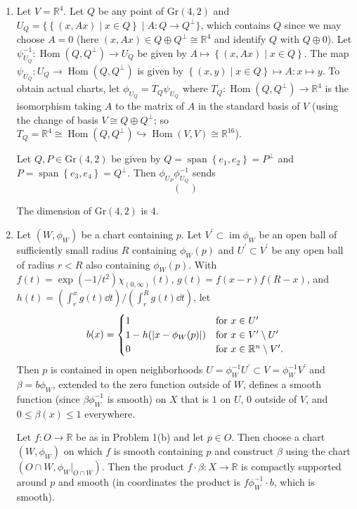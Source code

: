 \documentclass[11pt,leqno]{article}
\theoremstyle{plain}
\theoremstyle{definition}
\numberwithin{equation}{section}
\numberwithin{lem}{section}
\newcommand{\cbr}[1]{\left\{#1\right\}}
\DeclareMathOperator{\Span}{span}
\DeclareMathOperator{\im}{im}
\DeclareMathOperator{\Hom}{Hom}
\newcommand{\Gr}{\mathrm{Gr}}
\begin{document}
\begin{enumerate}
    \item Let $V = \mathbb R^4$. Let $Q$ be any point of $\Gr(4,2)$ and $U_Q = \{\cbr{(x,Ax)\mid x\in Q}\mid A\colon Q\to Q^\perp\}$, which contains $Q$ since we may choose $A = 0$ (here $(x,Ax)\in Q\oplus Q^\perp\cong \mathbb R^4$ and identify $Q$ with $Q\oplus 0$). Let $\psi_{U_Q}^{-1}\colon \Hom(Q,Q^\perp)\to U_Q$ be given by $A\mapsto \cbr{(x,Ax)\mid x\in Q}$. The map $\psi_{U_Q}\colon U_Q\to\Hom(Q,Q^\perp)$ is given by $\cbr{(x,y)\mid x\in Q}\mapsto A\colon x\mapsto y$. To obtain actual charts, let $\phi_{U_Q} = T_Q\psi_{U_Q}$ where $T_Q\colon \Hom(Q,Q^\perp)\to\mathbb R^4$ is the isomorphism taking $A$ to the matrix of $A$ in the standard basis of $V$ (using the change of basis $V \cong Q\oplus Q^\perp$; so $T_Q = \mathbb R^4\cong \Hom(Q,Q^\perp)\hookrightarrow \Hom(V,V)\cong \mathbb R^{16}$).
    
    Let $Q,P\in \Gr(4,2)$ be given by $Q = \Span\cbr{e_1,e_2} = P^\perp$ and $P = \Span\cbr{e_3,e_4} = Q^\perp$. Then $\phi_{U_P}\phi_{U_Q}^{-1}$ sends 
    \[\begin{pmatrix}
      
    \end{pmatrix}\]
    
    The dimension of $\Gr(4,2)$ is $4$.
    \item Let $(W,\phi_W)$ be a chart containing $p$. Let $V^\prime\subset \im\phi_W$ be an open ball of sufficiently small radius $R$ containing $\phi_W(p)$ and $U^\prime\subset V^\prime$ be any open ball of radius $r<R$ also containing $\phi_W(p)$. With $f(t) = \exp(-1/t^2)\chi_{(0,\infty)}(t)$, $g(t) = f(x-r)f(R-x)$, and $h(t) = (\int_r^xg(t)\dd t)/(\int_r^Rg(t)\dd t)$, let 
    \[b(x) = \begin{cases}
      1 & \text{for }x\in U^\prime\\
      1-h(\abs{x-\phi_W(p)}) & \text{for }x\in V^\prime\setminus U^\prime\\
      0 & \text{for } x\in \mathbb R^n\setminus V^\prime.
    \end{cases}\]
    Then $p$ is contained in open neighborhoods $U = \phi_W^{-1}U^\prime\subset V = \phi_W^{-1}V^\prime$ and $\beta = b\phi_W$, extended to the zero function outside of $W$, defines a smooth function (since $\beta\phi_W^{-1}$ is smooth) on $X$ that is $1$ on $U$, $0$ outside of $V$, and $0\leq \beta(x)\leq 1$ everywhere. 

    Let $f\colon O\to \mathbb R$ be as in Problem 1(b) and let $p\in O$. Then choose a chart $(W,\phi_W)$ on which $f$ is smooth containing $p$ and construct $\beta$ using the chart $(O\cap W,\phi_W|_{O\cap W})$. Then the product $f\cdot\beta\colon X\to\mathbb R$ is compactly supported around $p$ and smooth (in coordinates the product is $f\phi_W^{-1}\cdot b$, which is smooth).
\end{enumerate}
\end{document}
